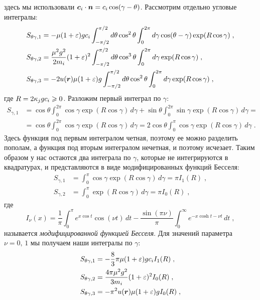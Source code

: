 здесь мы использовали $\bm{c}_i\cdot\bm{n}=c_i\cos(\gamma-\theta)$. Рассмотрим отдельно угловые интегралы:
\begin{equation}
  \begin{split}
    S_{\theta\gamma,1} &= -\mu(1+\varepsilon)gc_i\int_{-\pi/2}^{\pi/2}d\theta\cos^2\theta\int_{0}^{2\pi}d\gamma\cos(\theta-\gamma)\exp(R\cos\gamma)\;,\\
    S_{\theta\gamma,2} &= \frac{\mu^2g^2}{2m_i}(1+\varepsilon)^2\int_{-\pi/2}^{\pi/2}d\theta\cos^3\theta\int_0^{2\pi}d\gamma\exp(R\cos\gamma)\;, \\
    S_{\theta\gamma,3} &= -2u(\bm{r})\mu(1+\varepsilon)g\int_{-\pi/2}^{\pi/2}d\theta\cos^2\theta\int_0^{2\pi}d\gamma\exp(R\cos\gamma)\;,
  \end{split}
\end{equation}
где $R=2\kappa_jgc_i\geqslant 0$. Разложим первый интеграл по $\gamma$:
\begin{equation}
  \begin{split}
    S_{\gamma,1} &= \cos\theta\int_{0}^{2\pi}\cos\gamma\exp(R\cos\gamma)\,d\gamma+\sin\theta\int_{0}^{2\pi}\sin\gamma\exp(R\cos\gamma)\,d\gamma=\\
    &=\cos\theta\int_{0}^{2\pi}\cos\gamma\exp(R\cos\gamma)\,d\gamma = 2\cos\theta\int_{0}^{\pi}\cos\gamma\exp(R\cos\gamma)\,d\gamma\;.
  \end{split}
\end{equation}
Здесь функция под первым интегралом четная, поэтому ее можно разделить пополам, а функция под вторым интегралом нечетная, и поэтому исчезает.
Таким образом у нас остаются два интеграла по $\gamma$, которые не интегрируются в квадратурах, и представляются в виде модифицированных функций 
Бесселя:
\begin{equation}
  \begin{split}
    S_{\gamma,1} &= \int_{0}^{\pi}\cos\gamma\exp(R\cos\gamma)\,d\gamma = \pi I_1(R)\;,\\
    S_{\gamma,2} &= \int_{0}^{\pi}\exp(R\cos\gamma)\,d\gamma = \pi I_0(R)\;,
  \end{split}
\end{equation}
где
\begin{equation}
  I_\nu(x) = \frac{1}{\pi}\int_{0}^{\pi}e^{x\cos t}\cos(\nu t)\,dt-\frac{\sin(\pi\nu)}{\pi}\int_{0}^{\infty}e^{-x\cosh t-\nu t}\,dt\;,
\end{equation}
называется \emph{модифицированной функцией Бесселя}. Для значений параметра $\nu=0,\,1$ мы получаем наши интегралы по $\gamma$:
\begin{equation}
  \begin{split}
    S_{\theta\gamma,1} &= -\frac{8}{3}\pi\mu(1+\varepsilon)gc_iI_1(R)\;,\\
    S_{\theta\gamma,2} &= \frac{4\pi\mu^2g^2}{3m_i}(1+\varepsilon)^2I_0(R)\;,\\
    S_{\theta\gamma,3} &= -\pi^2u(\bm{r})\mu(1+\varepsilon)gI_0(R)\;,
  \end{split}
\end{equation}
